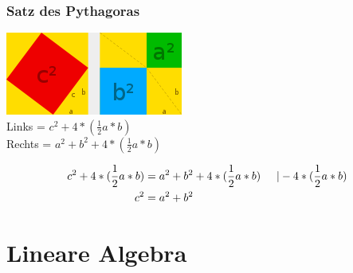\documentclass[a4paper]{article} %
\begin{document}
	\subsubsection{Satz des Pythagoras}
	\includegraphics[width=220 px, height=103 px]{pytha.png}\\
	Links = $c^2+ 4*(\frac{1}{2}a*b)$\\
	Rechts = $a^2+b^2+4*(\frac{1}{2}a*b)$

	\begin{align*}
	c^2+ 4*(\frac{1}{2}a*b) &= a^2+b^2+4*(\frac{1}{2}a*b)  \hspace{0.5 cm} |-4*(\frac{1}{2}a*b)\\
	c^2 &= a^2+b^2
	\end{align*}


	
	
	\section{Lineare Algebra}
\end{document}
